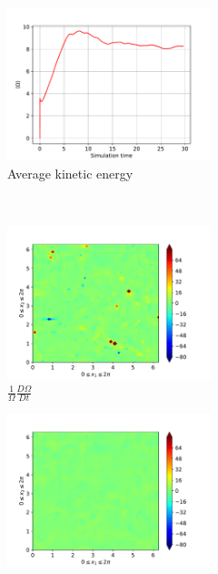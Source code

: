 \begin{figure}[H]
    \begin{subfigure}[H]{0.45\textwidth}
        \includegraphics[height=1.75in]{media/run-cds-65/enst-average1330}
        \caption{Average kinetic energy}
    \end{subfigure}
    ~
    \begin{subfigure}[H]{0.45\textwidth}
        \includegraphics[height=1.75in]{media/run-cds-65/enst-1330}
        \caption{$\frac{1}{\Omega} \frac{D \Omega}{Dt}$}
    \end{subfigure}
    \newline
    \begin{subfigure}{0.45\textwidth}
        \includegraphics[height=1.75in]{media/run-cds-65/A-enst-1330}

\end{subfigure}
\end{figure}
